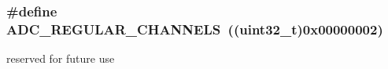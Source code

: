 \subsubsection[{\texorpdfstring{A\+D\+C\+\_\+\+R\+E\+G\+U\+L\+A\+R\+\_\+\+C\+H\+A\+N\+N\+E\+LS}{ADC_REGULAR_CHANNELS}}]{\setlength{\rightskip}{0pt plus 5cm}\#define A\+D\+C\+\_\+\+R\+E\+G\+U\+L\+A\+R\+\_\+\+C\+H\+A\+N\+N\+E\+LS~((uint32\+\_\+t)0x00000002)}\hypertarget{group___a_d_c__channels__type_gad47a927eded315f3dcb21df51ff778fd}{}\label{group___a_d_c__channels__type_gad47a927eded315f3dcb21df51ff778fd}
reserved for future use 